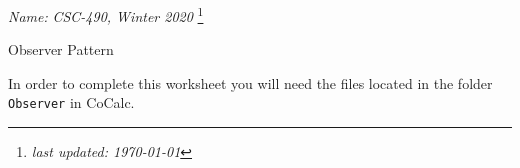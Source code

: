 \documentclass[11pt]{article}
\newlength{\up}\setlength{\up}{-\baselineskip}
\newcommand\blfootnote[1]{%
  \begingroup
  \renewcommand\thefootnote{}\footnote{#1}%
  \addtocounter{footnote}{-1}%
  \endgroup
}
\begin{document}
\noindent\emph{Name:}
\hfill
\emph{CSC-490, Winter 2020}
\blfootnote{\emph{last updated: \today}}

\begin{center}
  {\huge Observer Pattern}
\end{center}

\medskip




In order to complete this worksheet you will need the files located in the folder \texttt{Observer} in CoCalc.
\end{document}
